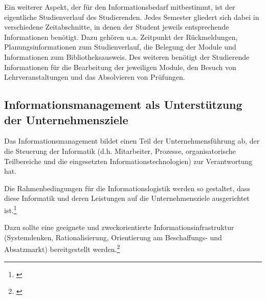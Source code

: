 Ein weiterer Aspekt, der für den Informationsbedarf mitbestimmt, ist der eigentliche Studienverlauf des Studierenden. Jedes Semester gliedert sich dabei in verschiedene Zeitabschnitte, in denen der Student jeweils entsprechende Informationen benötigt. Dazu gehören u.a. Zeitpunkt der Rückmeldungen, Planungsinformationen zum Studienverlauf, die Belegung der Module und Informationen zum Bibliotheksausweis. Des weiteren benötigt der Studierende Informationen für die Bearbeitung der jeweiligen Module, den Besuch von Lehrveranstaltungen und das Absolvieren von Prüfungen. 

\subsection{Informationsmanagement als Unterstützung der Unternehmensziele}
Das Informationsmanagement bildet einen Teil der Unternehmensführung ab, der die Steuerung der Informatik (d.h. Mitarbeiter, Prozesse, organisatorische Teilbereiche und die eingesetzten Informationstechnologien) zur Verantwortung hat.

Die Rahmenbedingungen für die Informationslogistik werden so gestaltet, dass diese Informatik und deren Leistungen auf die Unternehmensziele ausgerichtet ist.\footnote{\cite{voss_informationsmanagement_2001}}

Dazu sollte eine geeignete und zweckorientierte Informationsinfrastruktur (Systemdenken, Rationalisierung, Orientierung am Beschaffungs- und Absatzmarkt) bereitgestellt werden.\footnote{\cite{Vgl. u.a. Vieweger, Bernd; Informationsmanagement; 2013}}

